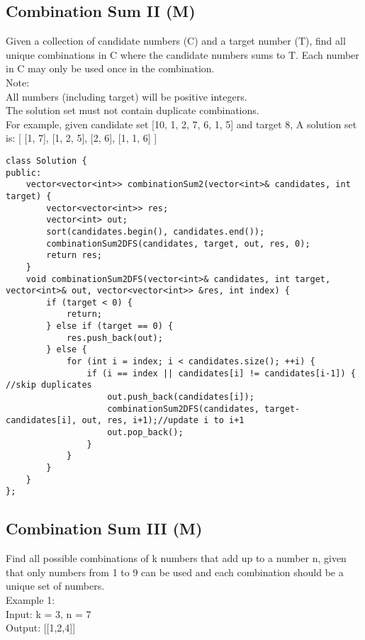 \subsection{Combination Sum II (M)}
Given a collection of candidate numbers (C) and a target number (T), find all unique combinations in C where the candidate numbers sums to T. Each number in C may only be used once in the combination.\\

Note:\\
    All numbers (including target) will be positive integers.\\
    The solution set must not contain duplicate combinations.\\

For example, given candidate set [10, 1, 2, 7, 6, 1, 5] and target 8, A solution set is: [ [1, 7], [1, 2, 5], [2, 6], [1, 1, 6] ] \\

\begin{lstlisting}
class Solution {
public:
    vector<vector<int>> combinationSum2(vector<int>& candidates, int target) {
        vector<vector<int>> res;
        vector<int> out;
        sort(candidates.begin(), candidates.end());
        combinationSum2DFS(candidates, target, out, res, 0);
        return res;        
    }
    void combinationSum2DFS(vector<int>& candidates, int target, vector<int>& out, vector<vector<int>> &res, int index) {
        if (target < 0) {
            return;
        } else if (target == 0) {
            res.push_back(out);
        } else {
            for (int i = index; i < candidates.size(); ++i) {
                if (i == index || candidates[i] != candidates[i-1]) { //skip duplicates
                    out.push_back(candidates[i]);
                    combinationSum2DFS(candidates, target-candidates[i], out, res, i+1);//update i to i+1
                    out.pop_back();
                }
            } 
        }
    }
};
\end{lstlisting}


\subsection{Combination Sum III (M)}
Find all possible combinations of k numbers that add up to a number n, given that only numbers from 1 to 9 can be used and each combination should be a unique set of numbers. \\

Example 1:\\
Input: k = 3, n = 7\\
Output: [[1,2,4]]\\

